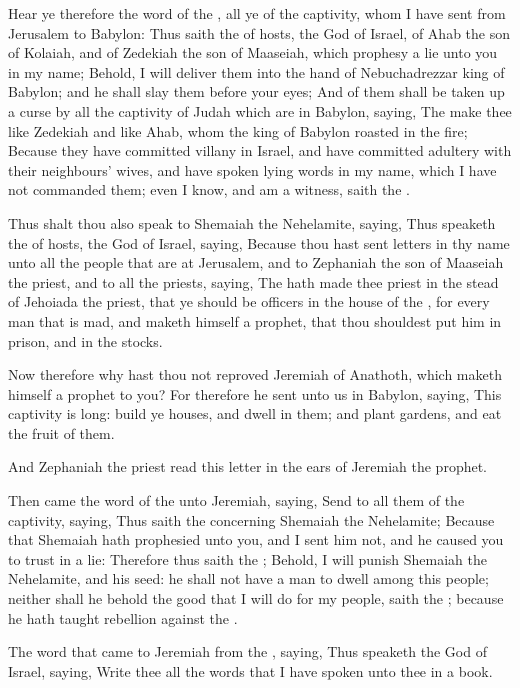 \Verse Hear ye therefore the word of the \LORD, all ye of the captivity, whom I have sent from Jerusalem to Babylon: \Verse Thus saith the \LORD of hosts, the God of Israel, of Ahab the son of Kolaiah, and of Zedekiah the son of Maaseiah, which prophesy a lie unto you in my name; Behold, I will deliver them into the hand of Nebuchadrezzar king of Babylon; and he shall slay them before your eyes; \Verse And of them shall be taken up a curse by all the captivity of Judah which are in Babylon, saying, The \LORD make thee like Zedekiah and like Ahab, whom the king of Babylon roasted in the fire; \Verse Because they have committed villany in Israel, and have committed adultery with their neighbours' wives, and have spoken lying words in my name, which I have not commanded them; even I know, and am a witness, saith the \LORD.

\Verse Thus shalt thou also speak to Shemaiah the Nehelamite, saying, \Verse Thus speaketh the \LORD of hosts, the God of Israel, saying, Because thou hast sent letters in thy name unto all the people that are at Jerusalem, and to Zephaniah the son of Maaseiah the priest, and to all the priests, saying, \Verse The \LORD hath made thee priest in the stead of Jehoiada the priest, that ye should be officers in the house of the \LORD, for every man that is mad, and maketh himself a prophet, that thou shouldest put him in prison, and in the stocks.

\Verse Now therefore why hast thou not reproved Jeremiah of Anathoth, which maketh himself a prophet to you?  \Verse For therefore he sent unto us in Babylon, saying, This captivity is long: build ye houses, and dwell in them; and plant gardens, and eat the fruit of them.

\Verse And Zephaniah the priest read this letter in the ears of Jeremiah the prophet.

\Verse Then came the word of the \LORD unto Jeremiah, saying, \Verse Send to all them of the captivity, saying, Thus saith the \LORD concerning Shemaiah the Nehelamite; Because that Shemaiah hath prophesied unto you, and I sent him not, and he caused you to trust in a lie: \Verse Therefore thus saith the \LORD; Behold, I will punish Shemaiah the Nehelamite, and his seed: he shall not have a man to dwell among this people; neither shall he behold the good that I will do for my people, saith the \LORD; because he hath taught rebellion against the \LORD.


\Chapter
\Verse The word that came to Jeremiah from the \LORD, saying, \Verse Thus speaketh the \LORD God of Israel, saying, Write thee all the words that I have spoken unto thee in a book.

